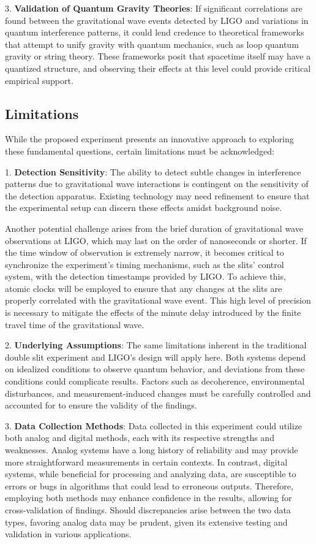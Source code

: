 \documentclass{article}
\begin{document}
3. \textbf{Validation of Quantum Gravity Theories}: If significant correlations are found between the gravitational wave events detected by LIGO and variations in quantum interference patterns, it could lend credence to theoretical frameworks that attempt to unify gravity with quantum mechanics, such as loop quantum gravity or string theory. These frameworks posit that spacetime itself may have a quantized structure, and observing their effects at this level could provide critical empirical support.

\subsection{Limitations}
While the proposed experiment presents an innovative approach to exploring these fundamental questions, certain limitations must be acknowledged:

1. \textbf{Detection Sensitivity}: The ability to detect subtle changes in interference patterns due to gravitational wave interactions is contingent on the sensitivity of the detection apparatus. Existing technology may need refinement to ensure that the experimental setup can discern these effects amidst background noise. 

Another potential challenge arises from the brief duration of gravitational wave observations at LIGO, which may last on the order of nanoseconds or shorter. If the time window of observation is extremely narrow, it becomes critical to synchronize the experiment’s timing mechanisms, such as the slits’ control system, with the detection timestamps provided by LIGO. To achieve this, atomic clocks will be employed to ensure that any changes at the slits are properly correlated with the gravitational wave event. This high level of precision is necessary to mitigate the effects of the minute delay introduced by the finite travel time of the gravitational wave.

2. \textbf{Underlying Assumptions}: The same limitations inherent in the traditional double slit experiment and LIGO's design will apply here. Both systems depend on idealized conditions to observe quantum behavior, and deviations from these conditions could complicate results. Factors such as decoherence, environmental disturbances, and measurement-induced changes must be carefully controlled and accounted for to ensure the validity of the findings.

3. \textbf{Data Collection Methods}: Data collected in this experiment could utilize both analog and digital methods, each with its respective strengths and weaknesses. Analog systems have a long history of reliability and may provide more straightforward measurements in certain contexts. In contrast, digital systems, while beneficial for processing and analyzing data, are susceptible to errors or bugs in algorithms that could lead to erroneous outputs. Therefore, employing both methods may enhance confidence in the results, allowing for cross-validation of findings. Should discrepancies arise between the two data types, favoring analog data may be prudent, given its extensive testing and validation in various applications.
\end{document}
